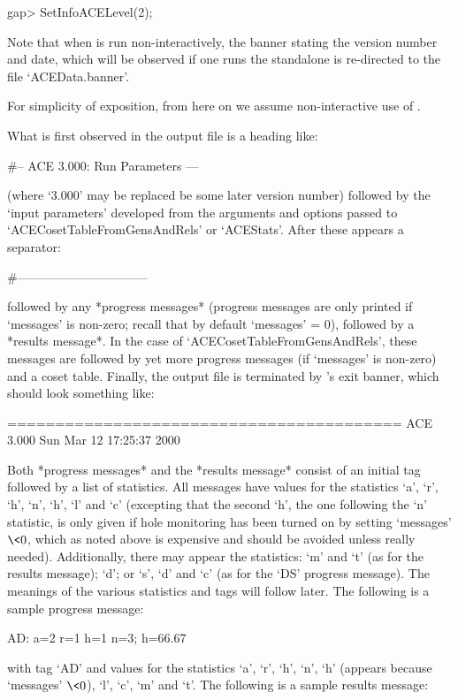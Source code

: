 \begintt
gap> SetInfoACELevel(2);
\endtt

Note that when {\ACE} is run non-interactively, the banner stating the
version number and date, which  will  be  observed  if  one  runs  the
standalone is re-directed to the file `ACEData.banner'.

For simplicity of exposition, from here on we  assume  non-interactive
use of {\ACE}.

What is first observed in the {\ACE} output file is a heading like:

\begintt
  #-- ACE 3.000: Run Parameters ---
\endtt

(where `3.000' may be replaced be some later version number)  followed
by the \lq{}input parameters' developed from the arguments and options
passed to `ACECosetTableFromGensAndRels' or  `ACEStats'.  After  these
appears a separator:

\begintt
  #--------------------------------
\endtt

followed by  any  *progress  messages*  (progress  messages  are  only
printed if `messages' is non-zero; recall that by default `messages' =
0),   followed   by   a   *results   message*.   In   the   case    of
`ACECosetTableFromGensAndRels', these messages  are  followed  by  yet
more progress messages (if `messages' is non-zero) and a coset  table.
Finally, the {\ACE} output file is terminated by {\ACE}'s exit banner,
which should look something like:

\begintt
=========================================
ACE 3.000        Sun Mar 12 17:25:37 2000
\endtt

Both *progress messages* and  the  *results  message*  consist  of  an
initial tag followed by a list of statistics. All messages have values
for the statistics `a', `r', `h', `n', `h',  `l'  and  `c'  (excepting
that the second `h', the one following  the  `n'  statistic,  is  only
given if hole monitoring has been turned on by setting `messages'  $\<
0$, which as noted above is expensive and  should  be  avoided  unless
really needed). Additionally, there may appear the statistics: `m' and
`t' (as for the results message); `d'; or `s', `d' and `c' (as for the
`DS' progress message). The meanings of  the  various  statistics  and
tags will follow later. The following is a sample progress message:

\begintt
AD: a=2 r=1 h=1 n=3; h=66.67%
\endtt

with tag `AD' and values for the statistics `a', `r',  `h',  `n',  `h'
(appears because `messages' $\<  0$),  `l',  `c',  `m'  and  `t'.  The
following is a sample results message:


